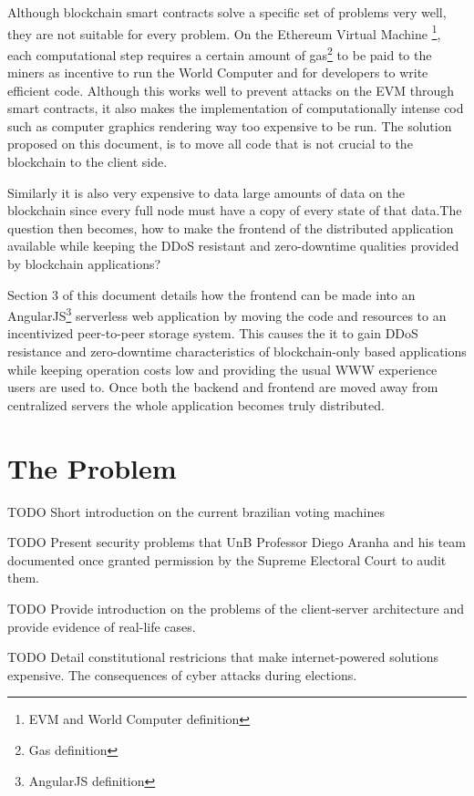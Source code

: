 \documentclass[twoside]{article}
\begin{document}
Although blockchain smart contracts solve a specific set of problems very well, they are not suitable for every problem. On the Ethereum Virtual Machine \footnote{EVM and World Computer definition}, each computational step requires a certain amount of gas\footnote{Gas definition} to be paid to the miners as incentive to run the World Computer and for developers to write efficient code. Although this works well to prevent attacks on the EVM through smart contracts, it also makes the implementation of computationally intense cod such as computer graphics rendering way too expensive to be run. The solution proposed on this document, is to move all code that is not crucial to the blockchain to the client side.

Similarly it is also very expensive to data large amounts of data on the blockchain since every full node must have a copy of every state of that data.The question then becomes, how to make the frontend of the distributed application available while keeping the DDoS resistant and zero-downtime qualities provided by blockchain applications?

Section 3 of this document details how the frontend can be made into an AngularJS\footnote{AngularJS definition} serverless web application by moving the code and resources to an incentivized peer-to-peer storage system. This causes the it to gain DDoS resistance and zero-downtime characteristics of blockchain-only based applications while keeping operation costs low and providing the usual WWW experience users are used to. Once both the backend and frontend are moved away from centralized servers the whole application becomes truly distributed.



\section{The Problem}

TODO Short introduction on the current brazilian voting machines

TODO Present security problems that UnB Professor Diego Aranha and his team documented once granted permission by the Supreme Electoral Court to audit them.

TODO Provide introduction on the problems of the client-server architecture and provide evidence of real-life cases.

TODO Detail constitutional restricions that make internet-powered solutions expensive. The consequences of cyber attacks during elections.
\end{document}
